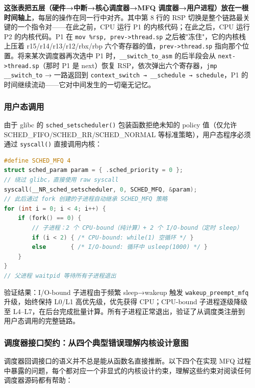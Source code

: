 \documentclass[a4paper]{article}
\begin{document}
\textbf{这张表把五层（硬件→中断→核心调度器→MFQ 调度器→用户进程）放在一根时间轴上}，每层的操作在同一行中对齐。其中第 8 行的 RSP 切换是整个链路最关键的一个指令对——在此之前，CPU 运行 P1 的内核代码；在此之后，CPU 运行 P2 的内核代码。P1 在 \texttt{mov \%rsp, prev->thread.sp} 之后被"冻住"，它的内核栈上压着 r15/r14/r13/r12/rbx/rbp 六个寄存器的值，\texttt{prev->thread.sp} 指向那个位置。将来某次调度器再次选中 P1 时，\texttt{\_\_switch\_to\_asm} 的后半段会从 \texttt{next->thread.sp}（那时 P1 是 next）恢复 RSP，依次弹出六个寄存器，\texttt{jmp \_\_switch\_to} → 一路返回到 \texttt{context\_switch → \_\_schedule → schedule}，P1 的时间继续流动——它对中间发生的一切毫无记忆。

\subsubsection{用户态调用}

由于 glibc 的 \texttt{sched\_setscheduler()} 包装函数拒绝未知的 policy 值（仅允许 SCHED\_FIFO/SCHED\_RR/SCHED\_NORMAL 等标准策略），用户态程序必须通过 \texttt{syscall()} 直接调用内核：

\begin{lstlisting}[language=C, caption={MFQ 用户态测试程序核心片段}, label={lst:mfq_user}]
#define SCHED_MFQ 4
struct sched_param param = { .sched_priority = 0 };
// 绕过 glibc，直接使用 raw syscall
syscall(__NR_sched_setscheduler, 0, SCHED_MFQ, &param);
// 此后通过 fork 创建的子进程自动继承 SCHED_MFQ 策略
for (int i = 0; i < 4; i++) {
    if (fork() == 0) {
        // 子进程：2 个 CPU-bound（纯计算）+ 2 个 I/O-bound（定时 sleep）
        if (i < 2) { /* CPU-bound: while(1) 空循环 */ }
        else       { /* I/O-bound: 循环中 usleep(1000) */ }
    }
}
// 父进程 waitpid 等待所有子进程退出
\end{lstlisting}

验证结果：I/O-bound 子进程由于频繁 sleep→wakeup 触发 \texttt{wakeup\_preempt\_mfq} 升级，始终保持 L0/L1 高优先级，优先获得 CPU；CPU-bound 子进程逐级降级至 L4–L7，在后台完成批量计算。所有子进程正常退出，验证了从调度类注册到用户态调用的完整链路。

\subsubsection{调度器接口契约：从四个典型错误理解内核设计意图}

调度器回调接口的语义并不总是能从函数名直接推断。以下四个在实现 MFQ 过程中暴露的问题，每个都对应一个非显式的内核设计约束，理解这些约束对阅读任何调度器源码都有帮助：
\end{document}
